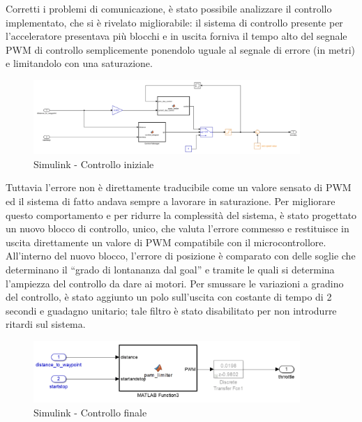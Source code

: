 \bigskip

Corretti i problemi di comunicazione, è stato possibile analizzare il controllo implementato, che si è rivelato migliorabile: il sistema di controllo presente per l’acceleratore presentava più blocchi e in uscita forniva il tempo alto del segnale PWM di controllo semplicemente ponendolo uguale al segnale di errore (in metri) e limitandolo con una saturazione.

\bigskip
\bigskip

\begin{figure}[h] 
\centering    
\includegraphics[width=0.9\textwidth]{Capitolo2/Figs/simulink1.png}
\caption[Simulink - controllo iniziale]{Simulink - Controllo iniziale}
\label{fig:controllo_iniziale}
\end{figure}

\bigskip

Tuttavia l’errore non è direttamente traducibile come un valore sensato di PWM ed il sistema di fatto andava sempre a lavorare in saturazione. Per migliorare questo comportamento e per ridurre la complessità del sistema, è stato progettato un nuovo blocco di controllo, unico, che valuta l’errore commesso e restituisce in uscita direttamente un valore di PWM compatibile con il microcontrollore. All’interno del nuovo blocco, l’errore di posizione è comparato con delle soglie che determinano il “grado di lontananza dal goal” e tramite le quali si determina l’ampiezza del controllo da dare ai motori. Per smussare le variazioni a gradino del controllo, è stato aggiunto un polo sull’uscita con costante di tempo di 2 secondi e guadagno unitario; tale filtro è stato disabilitato per non introdurre ritardi sul sistema.

\bigskip
\bigskip

\begin{figure}[h] 
\centering    
\includegraphics[width=0.9\textwidth]{Capitolo2/Figs/simulink2.png}
\caption[Simulink - controllo finale]{Simulink - Controllo finale}
\label{fig:controllo_finale}
\end{figure}

